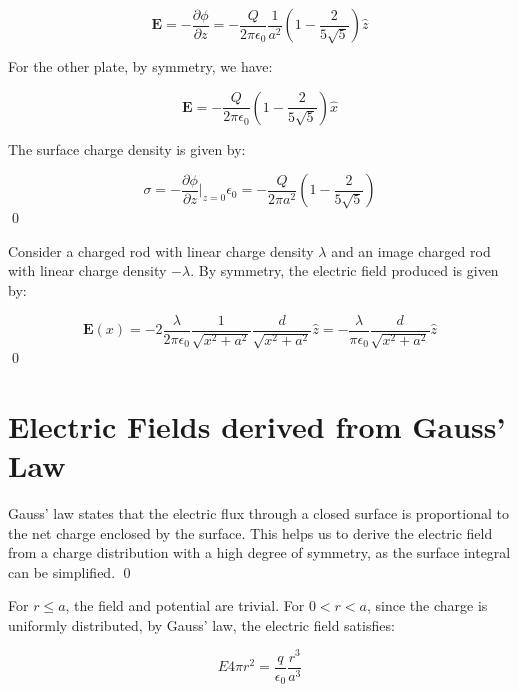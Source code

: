 \documentclass[12pt]{article}
\begin{document}
\begin{equation}
    \mathbf{E} = -\frac{\partial \phi}{\partial z} = -\frac{Q}{2\pi \epsilon_{0}} \frac{1}{a^{2}} \left( 1 - \frac{2}{5\sqrt{5}} \right) \hat{z}
\end{equation}

For the other plate, by symmetry, we have:

\begin{equation}
    \mathbf{E} = -\frac{Q}{2\pi \epsilon_{0}} \left( 1 - \frac{2}{5\sqrt{5}} \right) \hat{x}
\end{equation}

The surface charge density is given by:

\begin{equation}
    \sigma = -\frac{\partial \phi}{\partial z}\vert_{z=0} \epsilon_{0} = -\frac{Q}{2\pi a^{2}} \left( 1 - \frac{2}{5\sqrt{5}} \right)
\end{equation}
\qed


Consider a charged rod with linear charge density $\lambda$ and an image charged rod with linear charge density $-\lambda$. By symmetry, the electric field produced is given by:

\begin{equation}
    \mathbf{E}(x) = -2 \frac{\lambda}{2\pi \epsilon_{0}} \frac{1}{\sqrt{x^{2} + a^{2}}} \frac{d}{\sqrt{x^{2} + a^{2}}} \hat{z} = -\frac{\lambda}{\pi \epsilon_{0}} \frac{d}{\sqrt{x^{2} + a^{2}}} \hat{z}
\end{equation}
\qed


\pagebreak
\section*{Electric Fields derived from Gauss' Law}


Gauss' law states that the electric flux through a closed surface is proportional to the net charge enclosed by the surface. This helps us to derive the electric field from a charge distribution with a high degree of symmetry, as the surface integral can be simplified.
\qed



For $r \le a$, the field and potential are trivial. For $0 < r < a$, since the charge is uniformly distributed, by Gauss' law, the electric field satisfies:

\begin{equation}
    E 4\pi r^{2} = \frac{q}{\epsilon_{0}} \frac{r^{3}}{a^{3}}
\end{equation}
\end{document}
